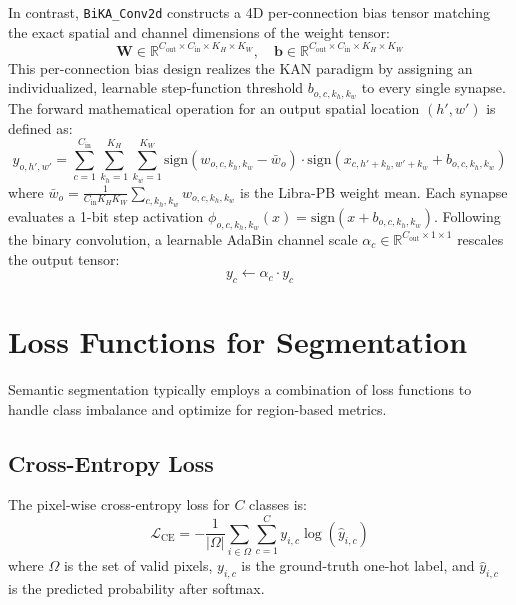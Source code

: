 \documentclass[a4paper]{report}
\begin{document}
In contrast, \texttt{BiKA\_Conv2d} constructs a 4D per-connection bias tensor matching the exact spatial and channel dimensions of the weight tensor:
\begin{equation}
    \mathbf{W} \in \mathbb{R}^{C_{\text{out}} \times C_{\text{in}} \times K_H \times K_W}, \quad \mathbf{b} \in \mathbb{R}^{C_{\text{out}} \times C_{\text{in}} \times K_H \times K_W}
\end{equation}
This per-connection bias design realizes the KAN paradigm by assigning an individualized, learnable step-function threshold $b_{o,c,k_h,k_w}$ to every single synapse. The forward mathematical operation for an output spatial location $(h', w')$ is defined as:
\begin{equation}
    y_{o,h',w'} = \sum_{c=1}^{C_{\text{in}}} \sum_{k_h=1}^{K_H} \sum_{k_w=1}^{K_W} \text{sign}\left(w_{o,c,k_h,k_w} - \bar{w}_o\right) \cdot \text{sign}\left(x_{c,h'+k_h,w'+k_w} + b_{o,c,k_h,k_w}\right)
\end{equation}
where $\bar{w}_o = \frac{1}{C_{\text{in}} K_H K_W} \sum_{c,k_h,k_w} w_{o,c,k_h,k_w}$ is the Libra-PB weight mean. Each synapse evaluates a 1-bit step activation $\phi_{o,c,k_h,k_w}(x) = \text{sign}(x + b_{o,c,k_h,k_w})$. Following the binary convolution, a learnable AdaBin channel scale $\alpha_c \in \mathbb{R}^{C_{\text{out}} \times 1 \times 1}$ rescales the output tensor:
\begin{equation}
    y_c \leftarrow \alpha_c \cdot y_c
\end{equation}


\section{Loss Functions for Segmentation}
\label{sec:losses}
Semantic segmentation typically employs a combination of loss functions to handle class imbalance and optimize for region-based metrics.

\subsection{Cross-Entropy Loss}
The pixel-wise cross-entropy loss for $C$ classes is:
\begin{equation}
    \mathcal{L}_{\text{CE}} = -\frac{1}{|\Omega|} \sum_{i \in \Omega} \sum_{c=1}^{C} y_{i,c} \log(\hat{y}_{i,c})
\end{equation}
where $\Omega$ is the set of valid pixels, $y_{i,c}$ is the ground-truth one-hot label, and $\hat{y}_{i,c}$ is the predicted probability after softmax.
\end{document}
